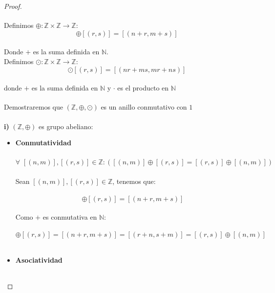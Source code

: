 \documentclass[11pt,letterpaper]{article}
\newcommand{\N}{\mathbb{N}}
\newcommand{\Z}{\mathbb{Z}}
\begin{document}
\begin{proof}\,\\
    \,\\
    Definimos $\oplus:\Z\times \Z \rightarrow  \Z$:\,\\
    \begin{equation*}
        [(n,m)]\oplus[(r,s)]=[(n+r,m+s)]
    \end{equation*}\,\\
    Donde $+$ es la suma definida en $\N$.\,\\
    Definimos $\odot:\Z\times \Z \rightarrow \Z$:\,\\
    \begin{equation*}
        [(n,m)]\odot [(r,s)]=[(nr+ms,mr+ns)]
    \end{equation*}\,\\
    donde $+$ es la suma definida en $\N$ y $\cdot$ es el producto en $\N$\,\\
    \,\\
    Demostraremos que $(\Z,\oplus,\odot)$ es un anillo conmutativo con $1$\,\\
    \,\\
    \textbf{i)}\,\,$(\Z,\oplus)$ es grupo abeliano:\,\\
    \begin{itemize}
        \item \textbf{Conmutatividad}\,\,\\
        \,\\
        $\forall\,\,[(n,m)],[(r,s)]\in \Z:([(n,m)]\oplus[(r,s)]=[(r,s)]\oplus[(n,m)])$\\
        \,\\
        Sean $[(n,m)],[(r,s)]\in \Z$, tenemos que:\,\\
        \,\\
        \begin{equation*}
            [(n,m)]\oplus[(r,s)]=[(n+r,m+s)]
        \end{equation*}\,\\
        Como $+$ es conmutativa en $\N$:\,\\
        \,\\
        \begin{equation*}
            [(n,m)]\oplus [(r,s)]=[(n+r,m+s)]=[(r+n,s+m)]=[(r,s)]\oplus [(n,m)]
        \end{equation*}\,\\
        \newpage
        \item \textbf{Asociatividad}\,\,\\
        \,\\

\end{itemize}
\end{proof}
\end{document}
